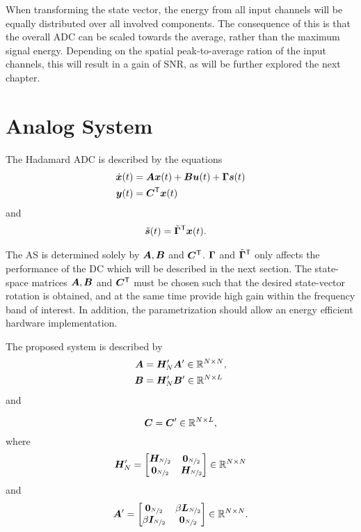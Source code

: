When transforming the state vector, the energy from all input channels will be equally distributed over all involved components. The consequence of this is that the overall ADC can be scaled towards the average, rather than the maximum signal energy. Depending on the spatial peak-to-average ration of the input channels, this will result in a gain of SNR, as will be further explored the next chapter.

\section{Analog System}
The Hadamard ADC is described by the equations
\begin{align}
    \dot{\bm{x}}(t) & = \bm{A} \bm{x}(t) + \bm{B} \bm{u}(t) + \bm{\Gamma} \bm{s}(t) \\
    \bm{y}(t) & = \bm{C}^\mathsf{T} \bm{x}(t)
\end{align}
and
\begin{align}
    \tilde{\bm{s}}(t) & = \tilde{\bm{\Gamma}}^\mathsf{T} \bm{x}(t).
\end{align}

The AS is determined solely by $\bm{A}, \bm{B}$ and $\bm{C}^\mathsf{T}$. $\bm{\Gamma}$ and $\tilde{\bm{\Gamma}}^\mathsf{T}$ only affects the performance of the DC which will be described in the next section. The state-space matrices $\bm{A}, \bm{B}$ and $\bm{C}^\mathsf{T}$ must be chosen such that the desired state-vector rotation is obtained, and at the same time provide high gain within the frequency band of interest. In addition, the parametrization should allow an energy efficient hardware implementation.

The proposed system is described by
\begin{align}
    \bm{A} & = \bm{H}'_N \bm{A}' \label{eq:AH_def} \in \mathbb{R}^{N \times N}, \\
    \bm{B} & = \bm{H}'_N \bm{B}' \label{eq:BH_def} \in \mathbb{R}^{N \times L}
\end{align}
and

\begin{equation}
    \label{eq:def_Cmat}
    \bm{C} = \bm{C}' \in \mathbb{R}^{N \times L},
\end{equation}
where
\begin{equation}
    \label{eq:defn_}
    \bm{H}'_N =
    \begin{bmatrix}
        \bm{H_}{\nicefrac{N}{2}} & \bm{0}_{\nicefrac{N}{2}} \\
        \bm{0}_{\nicefrac{N}{2}} & \bm{H_}{\nicefrac{N}{2}}
    \end{bmatrix} \in \mathbb{R}^{N \times N}
\end{equation}
and
\begin{equation}
    \label{eq:def_AH_}
    \bm{A}' =
    \begin{bmatrix}
        \bm{0}_{\nicefrac{N}{2}} & \beta \bm{L}_{\nicefrac{N}{2}} \\
        \beta \bm{I}_{\nicefrac{N}{2}} & \bm{0}_{\nicefrac{N}{2}}
    \end{bmatrix} \in \mathbb{R}^{N \times N}.
\end{equation}

